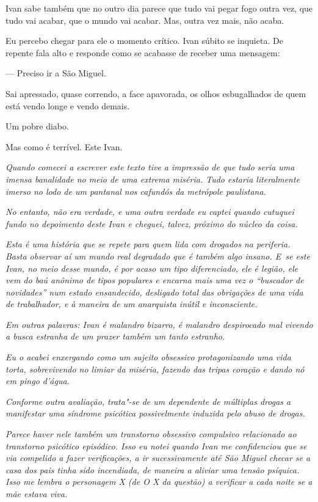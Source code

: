 Ivan sabe também que no outro dia parece que tudo vai pegar fogo outra
vez, que tudo vai acabar, que o mundo vai acabar. Mas, outra vez mais,
não acaba.

\asterisc{}

Eu percebo chegar para ele o momento crítico. Ivan súbito se inquieta.
De repente fala alto e responde como se acabasse de receber uma
mensagem:

— Preciso ir a São Miguel.

Sai apressado, quase correndo, a face apavorada, os olhos esbugalhados
de quem está vendo longe e vendo demais.

Um pobre diabo.

Mas como é terrível. Este Ivan.

\begin{center}\asterisc{}\end{center}
\begingroup\small

\emph{Quando comecei a escrever este texto tive a impressão de que tudo
seria uma imensa banalidade no meio de uma extrema miséria. Tudo estaria
literalmente imerso no lodo de um pantanal nos cafundós da metrópole
paulistana.}

\emph{No entanto, não era verdade, e uma outra verdade eu captei quando
cutuquei fundo no depoimento deste Ivan e cheguei, talvez, próximo do
núcleo da coisa.}

\emph{Esta é uma história que se repete para quem lida com drogados na
periferia. Basta observar aí um mundo real degradado que é também algo
insano. E~se este Ivan, no meio desse mundo, é por acaso um tipo
diferenciado, ele é legião, ele vem do baú anônimo de tipos populares e
encarna mais uma vez o ``buscador de novidades'' num estado ensandecido,
desligado total das obrigações de uma vida de trabalhador, e à maneira
de um anarquista inútil e inconsciente.}

\emph{Em outras palavras: Ivan é malandro bizarro, é malandro
despirocado mal vivendo a busca estranha de um prazer também um tanto
estranho.}

\emph{Eu o acabei enxergando como um sujeito obsessivo protagonizando
uma vida torta, sobrevivendo no limiar da miséria, fazendo das tripas
coração e dando nó em pingo d'água.}

\emph{Conforme outra avaliação, trata"-se de um dependente de múltiplas
drogas a manifestar uma síndrome psicótica possivelmente induzida pelo
abuso de drogas.}

\emph{Parece haver nele também um transtorno obsessivo compulsivo
relacionado ao transtorno psicótico episódico. Isso eu notei quando Ivan
me confidenciou que se via compelido a fazer verificações, a ir
sucessivamente até São Miguel checar se a casa dos pais tinha sido
incendiada, de maneira a aliviar uma tensão psíquica. Isso me lembra o
personagem X (de O X da questão) a verificar a cada noite se a mãe
estava viva.}

